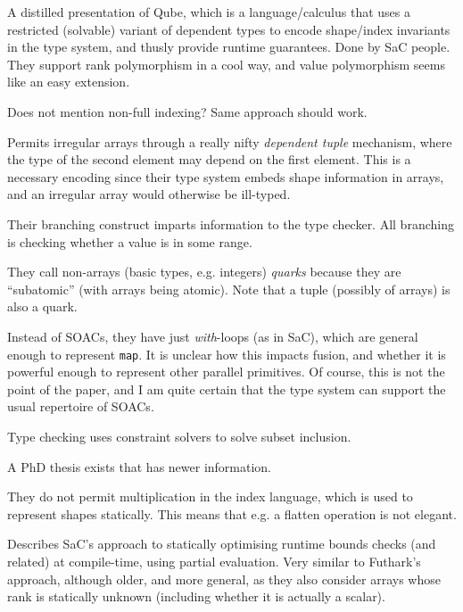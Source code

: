\documentclass[a4paper, oneside, final]{memoir}
\begin{document}
\begin{quote}
\end{quote}

A distilled presentation of Qube, which is a language/calculus that
uses a restricted (solvable) variant of dependent types to encode
shape/index invariants in the type system, and thusly provide runtime
guarantees.  Done by SaC people.  They support rank polymorphism in a
cool way, and value polymorphism seems like an easy extension.

Does not mention non-full indexing?  Same approach should work.

Permits irregular arrays through a really nifty \textit{dependent
  tuple} mechanism, where the type of the second element may depend on
the first element.  This is a necessary encoding since their type
system embeds shape information in arrays, and an irregular array
would otherwise be ill-typed.

Their branching construct imparts information to the type checker.
All branching is checking whether a value is in some range.

They call non-arrays (basic types, e.g. integers) \textit{quarks}
because they are ``subatomic'' (with arrays being atomic).  Note that
a tuple (possibly of arrays) is also a quark.

Instead of SOACs, they have just \textit{with}-loops (as in SaC),
which are general enough to represent \texttt{map}.  It is unclear how
this impacts fusion, and whether it is powerful enough to represent
other parallel primitives.  Of course, this is not the point of the
paper, and I am quite certain that the type system can support the
usual repertoire of SOACs.

Type checking uses constraint solvers to solve subset inclusion.

A PhD thesis exists that has newer information.

They do not permit multiplication in the index language, which is used
to represent shapes statically.  This means that e.g. a flatten
operation is not elegant.

\begin{quote}
\end{quote}

Describes SaC's approach to statically optimising runtime bounds
checks (and related) at compile-time, using partial evaluation.  Very
similar to Futhark's approach, although older, and more general, as
they also consider arrays whose rank is statically unknown (including
whether it is actually a scalar).
\end{document}
